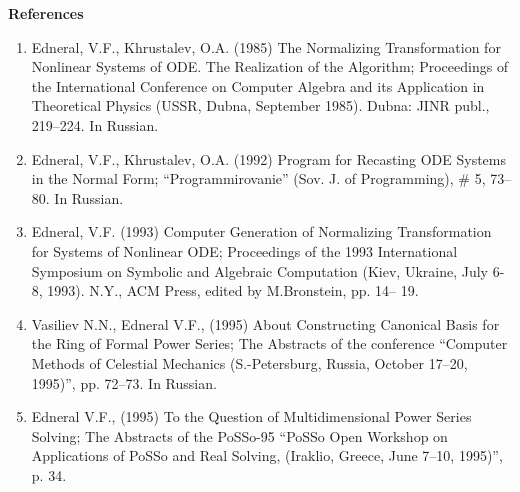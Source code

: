 \bigskip
\noindent 
{\bf References}
\begin{enumerate}

\item
Edneral, V.F., Khrustalev, O.A. (1985) The Normalizing Transformation for Nonlinear Systems of
ODE. The Realization of the Algorithm; Proceedings of the International Conference on Computer
Algebra and its Application in Theoretical Physics (USSR, Dubna, September 1985). Dubna: JINR
publ., 219--224. In Russian. 


\item
Edneral, V.F., Khrustalev, O.A. (1992) Program for Recasting ODE Systems in the Normal Form;
``Programmirovanie'' (Sov. J. of Programming), \# 5, 73--80. In Russian. 


\item
Edneral, V.F. (1993) Computer Generation of Normalizing Transformation for Systems of
Nonlinear ODE; Proceedings of the 1993 International Symposium on Symbolic and Algebraic
Computation (Kiev, Ukraine, July 6-8, 1993). N.Y., ACM Press, edited by M.Bronstein, pp. 14--
19. 


\item
Vasiliev N.N., Edneral V.F., (1995) About Constructing Canonical Basis for the Ring of Formal
Power Series; The Abstracts of the conference ``Computer Methods of Celestial Mechanics
(S.-Petersburg, Russia, October 17--20, 1995)'', pp. 72--73. In Russian. 


\item
Edneral V.F., (1995) To the Question of Multidimensional Power Series Solving; The Abstracts of
the PoSSo-95 ``PoSSo Open Workshop on Applications of PoSSo and Real Solving, (Iraklio,
Greece, June 7--10, 1995)'', p. 34. 


\end{enumerate}